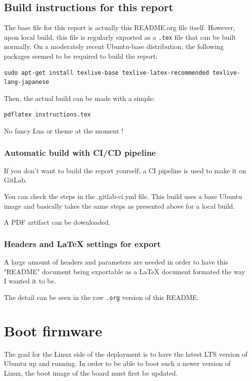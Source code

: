 \documentclass[10pt]{article}
\begin{document}
\subsection{Build instructions for this report}
\label{sec:org332102a}
The base file for this report is actually this README.org file itself.
However, upon local build, this file is regularly exported as
a \texttt{.tex} file that can be built normally.
On a moderately recent Ubuntu-base distribution, the following packages seemed to be required to build the
report:

\begin{verbatim}
sudo apt-get install texlive-base texlive-latex-recommended texlive-lang-japanese
\end{verbatim}

Then, the actual build can be made with a simple:

\begin{verbatim}
pdflatex instructions.tex
\end{verbatim}

No fancy Lua or theme at the moment !

\subsubsection{Automatic build with CI/CD pipeline}
\label{sec:org212d9d2}
If you don't want to build the report yourself, a CI pipeline is used to make it on GitLab.

You can check the steps in the .gitlab-ci.yml file.
This build uses a base Ubuntu image and basically takes the same steps as presented above for a local build.

A PDF artifact can be downloaded.

\subsubsection{Headers and \LaTeX{} settings for export}
\label{sec:org7ee0e5d}
A large amount of headers and parameters are needed in order
to have this "README" document being exportable as a \LaTeX{}
document formated the way I wanted it to be.

The detail can be seen in the raw \texttt{.org} version of this README.

\section{Boot firmware}
\label{sec:org4347c6d}
The goal for the Linux side of the deployment is to
have the latest LTS version of Ubuntu up and running.
In order to be able to boot such a newer version of Linux, the
boot image of the board must first be updated.
\end{document}
